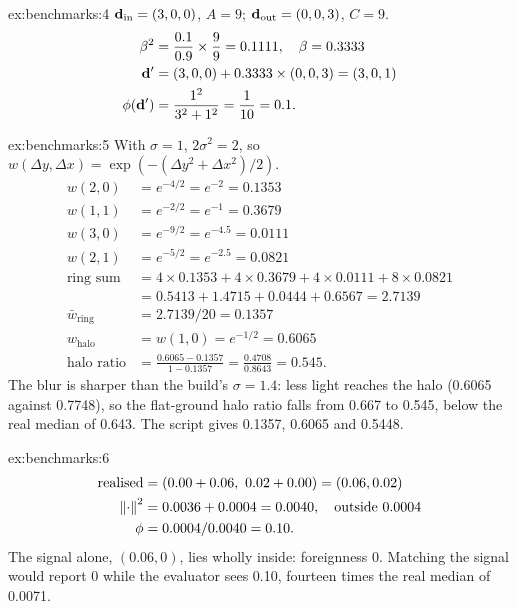 \begin{solution}{ex:benchmarks:4}
$\mathbf{d}_{\text{in}} = (3, 0, 0)$, $A = 9$; $\mathbf{d}_{\text{out}} = (0, 0, 3)$, $C = 9$.
\begin{align*}
\beta^2 &= \frac{0.1}{0.9} \times \frac{9}{9} = 0.1111, \quad \beta = 0.3333\\
\mathbf{d}' &= (3, 0, 0) + 0.3333 \times (0, 0, 3) = (3, 0, 1)\\
\phi(\mathbf{d}') &= \frac{1^2}{3^2 + 1^2} = \frac{1}{10} = 0.1.
\end{align*}
\end{solution}

\begin{solution}{ex:benchmarks:5}
With $\sigma = 1$, $2\sigma^2 = 2$, so $w(\Delta y, \Delta x) = \exp(-(\Delta y^2 + \Delta x^2)/2)$.
\begin{align*}
w(2,0) &= e^{-4/2} = e^{-2} = 0.1353\\
w(1,1) &= e^{-2/2} = e^{-1} = 0.3679\\
w(3,0) &= e^{-9/2} = e^{-4.5} = 0.0111\\
w(2,1) &= e^{-5/2} = e^{-2.5} = 0.0821\\
\text{ring sum} &= 4 \times 0.1353 + 4 \times 0.3679 + 4 \times 0.0111 + 8 \times 0.0821\\
&= 0.5413 + 1.4715 + 0.0444 + 0.6567 = 2.7139\\
\bar w_{\text{ring}} &= 2.7139 / 20 = 0.1357\\
w_{\text{halo}} &= w(1,0) = e^{-1/2} = 0.6065\\
\text{halo ratio} &= \frac{0.6065 - 0.1357}{1 - 0.1357} = \frac{0.4708}{0.8643} = 0.545.
\end{align*}
The blur is sharper than the build's $\sigma = 1.4$: less light reaches the halo (0.6065 against 0.7748), so the
flat-ground halo ratio falls from 0.667 to 0.545, below the real median of 0.643. The script gives 0.1357, 0.6065 and
0.5448.
\end{solution}

\begin{solution}{ex:benchmarks:6}
\begin{align*}
\text{realised} &= (0.00 + 0.06,\ 0.02 + 0.00) = (0.06, 0.02)\\
\left\lVert \cdot \right\rVert^2 &= 0.0036 + 0.0004 = 0.0040, \quad \text{outside } 0.0004\\
\phi &= 0.0004 / 0.0040 = 0.10.
\end{align*}
The signal alone, $(0.06, 0)$, lies wholly inside: foreignness 0. Matching the signal would report 0 while the evaluator
sees 0.10, fourteen times the real median of 0.0071.
\end{solution}
